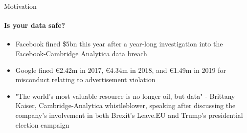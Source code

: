\begin{frame}{Motivation}
    \framesubtitle{Is your data safe?}
    \begin{itemize}
        \item Facebook fined \$5bn this year after a year-long investigation into the Facebook-Cambridge Analytica data breach
        \item Google fined €2.42m in 2017, €4.34m in 2018, and €1.49m in 2019 for misconduct relating to advertisement violation
        \item "The world's most valuable resource is no longer oil, but data" - Brittany Kaiser, Cambridge-Analytica whistleblower, speaking after discussing the company's involvement in both Brexit's Leave.EU and Trump's presidential election campaign
    \end{itemize}
\end{frame}